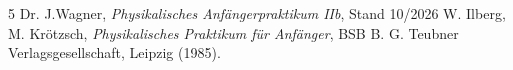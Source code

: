 \documentclass[12pt,a4paper,titlepage]{scrartcl}
\numberwithin{equation}{section}
\numberwithin{table}{section}
\numberwithin{figure}{section}
\begin{document}
\clearpage

\listoffigures


\listoftables

\begin{thebibliography}{5}
     Dr. J.Wagner, \emph{Physikalisches Anfängerpraktikum IIb}, Stand 10/2026
     W. Ilberg, M. Krötzsch, \emph{Physikalisches Praktikum für Anfänger}, BSB B. G. Teubner Verlagsgesellschaft, Leipzig (1985).
\end{thebibliography}

\end{document}
